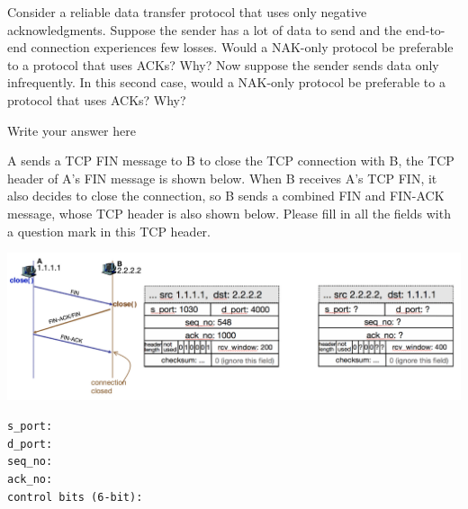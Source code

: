 \documentclass{report}
\begin{document}
\newpage


\begin{problem}
Consider a reliable data transfer protocol that uses only negative acknowledgments. Suppose the sender has a lot of data to send and the end-to-end connection experiences few losses. Would a NAK-only protocol be preferable to a protocol that uses ACKs? Why? Now suppose the sender sends data only infrequently. In this second case, would a NAK-only protocol be preferable to a protocol that uses ACKs? Why? \\

\begin{answer}{35em}
  Write your answer here
\end{answer}

\end{problem}

\newpage



\begin{problem}

A sends a TCP FIN message to B to close the TCP connection with B, the TCP header of A's FIN message is shown below. 
When B receives A's TCP FIN, it also decides to close the connection, so B sends a combined FIN and FIN-ACK message, whose TCP header is also shown below.  Please fill in all the fields with a question mark in this TCP header.

\includegraphics[width=\textwidth]{hw4_fig.pdf}

\begin{answer}{35em}

    \texttt{s\_port:}  \\
    \texttt{d\_port:}  \\
    \texttt{seq\_no:}  \\
    \texttt{ack\_no:}  \\
    \texttt{control bits (6-bit):}  \\
\end{answer}

\end{problem}
\end{document}
